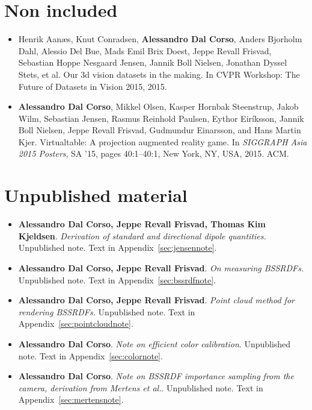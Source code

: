 \section*{Non included}
\begin{itemize}
\item Henrik Aanæs, Knut Conradsen, \textbf{Alessandro Dal Corso}, Anders Bjorholm Dahl, Alessio Del Bue, Mads Emil Brix Doest, Jeppe Revall Frisvad, Sebastian Hoppe Nesgaard Jensen, Jannik Boll Nielsen, Jonathan Dyssel Stets, et al. Our 3d vision datasets in the making. In CVPR Workshop: The Future of Datasets in Vision 2015, 2015.~\cite{aanaes2015our}
\item \textbf{Alessandro Dal Corso}, Mikkel Olsen, Kasper Hornbak Steenstrup, Jakob Wilm, Sebastian Jensen, Rasmus Reinhold Paulsen, Eythor Eiríksson, Jannik Boll Nielsen, Jeppe Revall Frisvad, Gudmundur Einarsson, and Hans Martin Kjer. Virtualtable: A projection augmented reality game. In \textit{SIGGRAPH Asia 2015 Posters}, SA ’15, pages 40:1–40:1, New York, NY, USA, 2015. ACM.~\cite{dalcorsosig15}
\end{itemize}

\section*{Unpublished material}
\begin{itemize}
\item \textbf{Alessandro Dal Corso, Jeppe Revall Frisvad, Thomas Kim Kjeldsen}. \textit{Derivation of standard and directional dipole quantities.} Unpublished note. Text in Appendix~\ref{sec:jensennote}.
\item \textbf{Alessandro Dal Corso, Jeppe Revall Frisvad}. \textit{On measuring BSSRDFs.} Unpublished note. Text in Appendix~\ref{sec:bssrdfnote}.
\item \textbf{Alessandro Dal Corso, Jeppe Revall Frisvad}. \textit{Point cloud method for rendering BSSRDFs.} Unpublished note. Text in Appendix~\ref{sec:pointcloudnote}.
\item \textbf{Alessandro Dal Corso}. \textit{Note on efficient color calibration}. Unpublished note. Text in Appendix~\ref{sec:colornote}.
\item \textbf{Alessandro Dal Corso}. \textit{Note on BSSRDF importance sampling from the camera, derivation from Mertens et al.}. Unpublished note. Text in Appendix~\ref{sec:mertensnote}.
\end{itemize}


